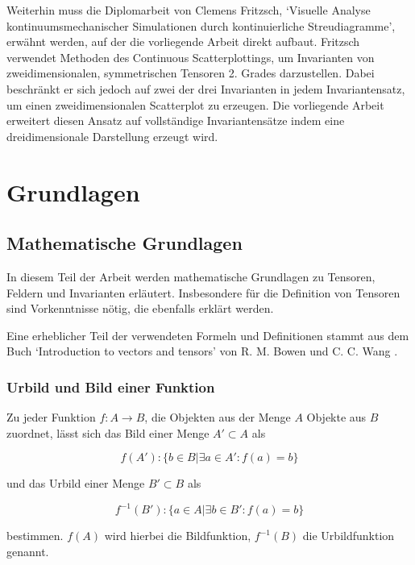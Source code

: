 \documentclass[a4paper,fontsize=12pt,toc=bib,halfparskip]{scrartcl}
\begin{document}
Weiterhin muss die Diplomarbeit von Clemens Fritzsch, `Visuelle Analyse kontinuumsmechanischer Simulationen durch kontinuierliche Streudiagramme'\cite{fritzsch2016continuousScatterplot}, erw\"ahnt werden, auf der die vorliegende Arbeit direkt aufbaut. Fritzsch verwendet Methoden des Continuous Scatterplottings, um Invarianten von zweidimensionalen, symmetrischen Tensoren 2. Grades darzustellen. Dabei beschr\"ankt er sich jedoch auf zwei der drei Invarianten in jedem Invariantensatz, um einen zweidimensionalen Scatterplot zu erzeugen. Die vorliegende Arbeit erweitert diesen Ansatz auf vollst\"andige Invariantens\"atze indem eine dreidimensionale Darstellung erzeugt wird.

\section{Grundlagen}
\label{sec:Grundlagen}
\subsection{Mathematische Grundlagen}
In diesem Teil der Arbeit werden mathematische Grundlagen zu Tensoren, Feldern und Invarianten erl\"autert. Insbesondere f\"ur die Definition von Tensoren sind Vorkenntnisse n\"otig, die ebenfalls erkl\"art werden. 

Eine erheblicher Teil der verwendeten Formeln und Definitionen stammt aus dem Buch `Introduction to vectors and tensors' von R. M. Bowen und C. C. Wang \cite{bowen2008introduction}.

\subsubsection{Urbild und Bild einer Funktion}
Zu jeder Funktion $f: A \rightarrow B$, die Objekten aus der Menge $A$ Objekte aus $B$ zuordnet, l\"asst sich das Bild einer Menge $A' \subset A$ als

\begin{equation}
	f(A'): \{ b \in B | \exists a \in A' : f(a) = b \}
\end{equation}

und das Urbild einer Menge $B' \subset B$ als

\begin{equation}
	f^{-1}(B'): \{ a \in A | \exists b \in B' : f(a) = b\}
\end{equation}

bestimmen. $f(A)$ wird hierbei die Bildfunktion, $f^{-1}(B)$ die Urbildfunktion genannt. 
\end{document}
